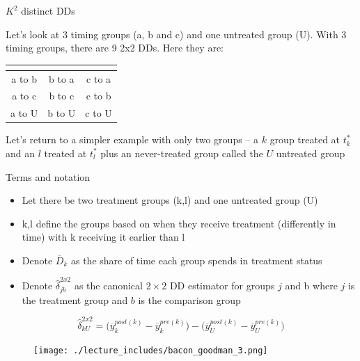 \documentclass{beamer}
\begin{document}
\begin{frame}{$K^2$ distinct DDs}

Let's look at 3 timing groups (a, b and c) and one untreated group (U).  With 3 timing groups, there are 9 2x2 DDs.  Here they are:


\begin{center}
\begin{tabular}{c|c|c}
\multicolumn{1}{l}{} &
\multicolumn{1}{l}{} &
\multicolumn{1}{l}{} \\
\midrule
a to b & b to a & c to a \\
a to c & b to c & c to b \\
a to U & b to U & c to U \\
\midrule
\end{tabular}
\end{center}

\bigskip

Let's return to a simpler example with only two groups -- a $k$ group treated at $t_k^*$ and an $l$ treated at $t_l^*$ plus an never-treated group called the $U$ untreated group
\end{frame} 


\begin{frame}{Terms and notation}

\begin{itemize}
\item Let there be two treatment groups (k,l) and one untreated group (U)
\item k,l define the groups based on when they receive treatment (differently in time) with k receiving it earlier than l
\item Denote $\overline{D}_k$ as the share of time each group spends in treatment status
\item Denote $\widehat{\delta}_{jb}^{2x2}$ as the canonical $2\times 2$ DD estimator for groups $j$ and b where $j$ is the treatment group and $b$ is the comparison group
\end{itemize}

\end{frame}





\begin{frame}[plain]
$$\widehat{\delta}^{2x2}_{kU} = \bigg ( \overline{y}_k^{post(k)} - \overline{y}_k^{pre(k)} \bigg ) - \bigg ( \overline{y}_U^{post(k)} - \overline{y}_U^{pre(k)} \bigg ) $$
	\begin{figure}
	\texttt{[image: ./lecture\_includes/bacon\_goodman\_3.png]}
	\end{figure}

\end{frame}
\end{document}
